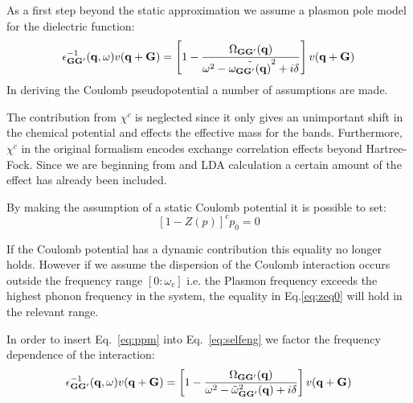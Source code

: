 \documentclass{article}
\def\q{{\bf q}}
\def\G{{\bf G}}
\begin{document}
As a first step beyond the static approximation we assume a plasmon pole 
model for the dielectric function:
%
\begin{equation}
\label{eq:ppm}
\epsilon_{\G\G'}^{-1}(\q,\omega)v(\q+\G) = \left[1-\frac{\Omega_{\G\G'}(\q)}{\omega^{2}-\tilde{\omega_{\G\G'}(\q)}^{2} + i\delta}\right]v(\q+\G)
\end{equation}
%
In deriving the Coulomb pseudopotential a number of assumptions are made.

The contribution from $\chi^{c}$ is neglected since 
it only gives an unimportant shift in the chemical
potential and effects the effective mass for the bands. 
Furthermore, $\chi^{c}$ in the original
formalism encodes exchange correlation effects beyond 
Hartree-Fock. Since we are beginning from
and LDA calculation a certain amount of the 
effect has already been included.

By making the assumption of a static Coulomb potential it is possible to set:
%
\begin{equation}
\label{eq:zeq0}
\left[1 -Z(p)\right]^{c}p_{0} = 0
\end{equation}

If the Coulomb potential has a dynamic contribution this equality no longer holds. However if
we assume the dispersion of the Coulomb interaction occurs outside the frequency range $[0:\omega_{c}]$
i.e. the Plasmon frequency exceeds the highest phonon frequency in the system,
the equality in Eq.\ref{eq:zeq0} will hold in the relevant range.

In order to insert Eq.~\ref{eq:ppm} into Eq.~\ref{eq:selfeng} we factor the frequency dependence of the interaction:
%
\begin{equation}
\epsilon_{\G\G'}^{-1}(\q,\omega)v(\q+\G) = \left[1- \frac{\Omega_{\G\G'}(\q)}{\omega^{2}-\tilde{\omega}^{2}_{\G\G'}(\q) + i\delta}\right]v(\q+\G)
\end{equation}
\end{document}
